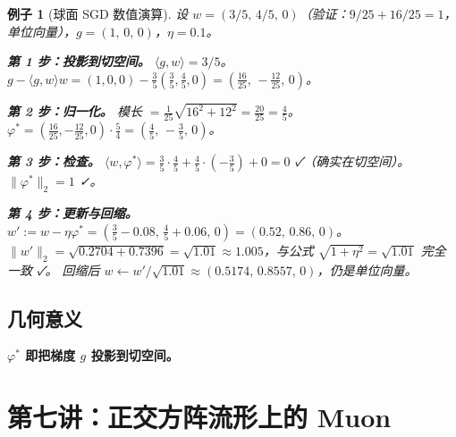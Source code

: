 \documentclass[11pt,a4paper]{article}
\theoremstyle{mythm}
\theoremstyle{mydef}
\newtheorem{example}[theorem]{例子}
\newcommand{\inner}[2]{\langle #1, #2 \rangle}
\begin{document}
\begin{example}[球面 SGD 数值演算]\label{ex:sphere-numeric}
设 $w = (3/5,\,4/5,\,0)$（验证：$9/25+16/25 = 1$，单位向量），$g = (1,\,0,\,0)$，$\eta = 0.1$。

\textbf{第 1 步：投影到切空间。}
$\inner{g}{w} = 3/5$。
$g - \inner{g}{w}w = (1,0,0) - \tfrac{3}{5}(\tfrac{3}{5},\tfrac{4}{5},0) = (\tfrac{16}{25},\,-\tfrac{12}{25},\,0)$。

\textbf{第 2 步：归一化。}
模长 $= \tfrac{1}{25}\sqrt{16^2 + 12^2} = \tfrac{20}{25} = \tfrac{4}{5}$。
$\varphi^\ast = (\tfrac{16}{25},-\tfrac{12}{25},0)\cdot \tfrac{5}{4} = (\tfrac{4}{5},\,-\tfrac{3}{5},\,0)$。

\textbf{第 3 步：检查。}
$\inner{w}{\varphi^\ast} = \tfrac{3}{5}\cdot\tfrac{4}{5} + \tfrac{4}{5}\cdot(-\tfrac{3}{5}) + 0 = 0$ ✓（确实在切空间）。
$\|\varphi^\ast\|_2 = 1$ ✓。

\textbf{第 4 步：更新与回缩。}
$w' := w - \eta\varphi^\ast = (\tfrac{3}{5}-0.08,\,\tfrac{4}{5}+0.06,\,0) = (0.52,\,0.86,\,0)$。
$\|w'\|_2 = \sqrt{0.2704 + 0.7396} = \sqrt{1.01} \approx 1.005$，与公式 $\sqrt{1+\eta^2}=\sqrt{1.01}$ 完全一致 ✓。
回缩后 $w \leftarrow w'/\sqrt{1.01} \approx (0.5174,\,0.8557,\,0)$，仍是单位向量。
\end{example}

\subsection{几何意义}

\begin{center}
\end{center}

\textbf{$\varphi^\ast$ 即把梯度 $g$ 投影到切空间。}

\section{第七讲：正交方阵流形上的 Muon}\label{sec:orth}
\end{document}
